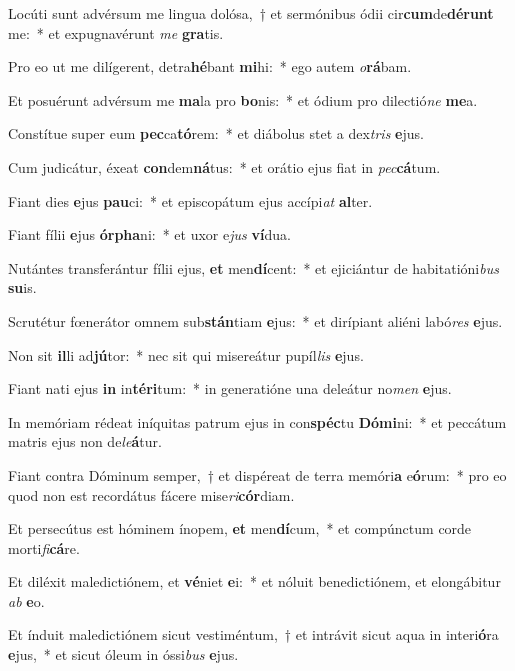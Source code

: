 \item Locúti sunt advérsum me lingua dolósa,~† et sermónibus ódii cir\textbf{cum}de\textbf{dé}\textbf{runt} me:~* et expugnavérunt \textit{me} \textbf{gra}tis.
\item Pro eo ut me dilígerent, detra\textbf{hé}bant \textbf{mi}hi:~* ego autem \textit{o}\textbf{rá}bam.
\item Et posuérunt advérsum me \textbf{ma}la pro \textbf{bo}nis:~* et ódium pro dilectió\textit{ne} \textbf{me}a.
\item Constítue super eum \textbf{pec}ca\textbf{tó}rem:~* et diábolus stet a dex\textit{tris} \textbf{e}jus.
\item Cum judicátur, éxeat \textbf{con}dem\textbf{ná}tus:~* et orátio ejus fiat in \textit{pec}\textbf{cá}tum.
\item Fiant dies \textbf{e}jus \textbf{pau}ci:~* et episcopátum ejus accípi\textit{at} \textbf{al}ter.
\item Fiant fílii \textbf{e}jus \textbf{ór}\textbf{pha}ni:~* et uxor e\textit{jus} \textbf{ví}dua.
\item Nutántes transferántur fílii ejus, \textbf{et} men\textbf{dí}cent:~* et ejiciántur de habitatióni\textit{bus} \textbf{su}is.
\item Scrutétur fœnerátor omnem sub\textbf{stán}tiam \textbf{e}jus:~* et dirípiant aliéni labó\textit{res} \textbf{e}jus.
\item Non sit \textbf{il}li ad\textbf{jú}tor:~* nec sit qui misereátur pupíl\textit{lis} \textbf{e}jus.
\item Fiant nati ejus \textbf{in} in\textbf{tér}\textbf{i}tum:~* in generatióne una deleátur no\textit{men} \textbf{e}jus.
\item In memóriam rédeat iníquitas patrum ejus in con\textbf{spéc}tu \textbf{Dó}\textbf{mi}ni:~* et peccátum matris ejus non de\textit{le}\textbf{á}tur.
\item Fiant contra Dóminum semper,~† et dispéreat de terra memóri\textbf{a} e\textbf{ó}rum:~* pro eo quod non est recordátus fácere mise\textit{ri}\textbf{cór}diam.
\item Et persecútus est hóminem ínopem, \textbf{et} men\textbf{dí}cum,~* et compúnctum corde morti\textit{fi}\textbf{cá}re.
\item Et diléxit maledictiónem, et \textbf{vé}niet \textbf{e}i:~* et nóluit benedictiónem, et elongábitur \textit{ab} \textbf{e}o.
\item Et índuit maledictiónem sicut vestiméntum,~† et intrávit sicut aqua in interi\textbf{ó}ra \textbf{e}jus,~* et sicut óleum in óssi\textit{bus} \textbf{e}jus.
